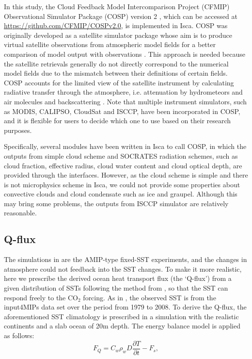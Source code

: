 In this study, the Cloud Feedback Model Intercomparison Project (CFMIP) Observational Simulator Package (COSP) version 2 \citep{Swales2018}, which can be accessed at \url{https://github.com/CFMIP/COSPv2.0}, is implemented in Isca. COSP was originally developed as a satellite simulator package whose aim is to produce virtual satellite observations from atmospheric model fields for a better comparison of model output with observations \citep{Bodas2011}. This approach is needed because the satellite retrievals generally do not directly correspond to the numerical model fields due to the mismatch between their definitions of certain fields. COSP accounts for the limited view of the satellite instrument by calculating radiative transfer through the atmosphere, i.e. attenuation by hydrometeors and air molecules and backscattering \citep{Kuma2020}. Note that multiple instrument simulators, such as MODIS, CALIPSO, CloudSat and ISCCP, have been incorporated in COSP, and it is flexible for users to decide which one to use based on their research purposes. 

Specifically, several modules have been written in Isca to call COSP, in which the outputs from simple cloud scheme and SOCRATES radiation schemes, such as cloud fraction, effective radius, cloud water content and cloud optical depth, are provided through the interfaces. However, as the cloud scheme is simple and there is not microphysics scheme in Isca, we could not provide some properties about convective clouds and cloud condensate such as ice and graupel. Although this may bring some problems, the outputs from ISCCP simulator are relatively reasonable.

\subsection{Q-flux}
The simulations in  are the AMIP-type fixed-SST experiments, and the changes in atmosphere could not feedback into the SST changes. To make it more realistic, here we prescribe the derived ocean heat transport flux (the `Q-flux') from a given distribution of SSTs following the method from \cite{Russell1985}, so that the SST can respond freely to the CO$_2$ forcing. As in , the observed SST is from the input4MIPs data set \citep{Durack2018} over the period from 1979 to 2008. To derive the Q-flux, the aforementioned SST climatology is prescribed in a simulation with the realistic continents and a slab ocean of 20m depth. The energy balance model is applied as follows:
\begin{equation}
    F_Q = C_w\rho_w D \frac{\partial T}{\partial t} - F_s,
    \label{eq:Q_flux}
\end{equation}

